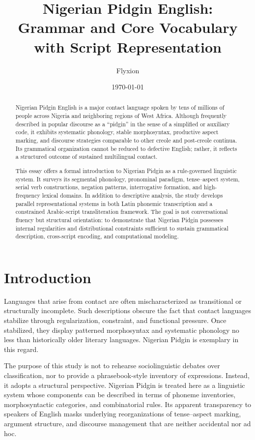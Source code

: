 \documentclass[12pt]{article}
\title{\textbf{Nigerian Pidgin English:\\
Grammar and Core Vocabulary with Script Representation}}
\author{Flyxion}
\date{\today}
\begin{document}
\maketitle

\begin{abstract}
\noindent
Nigerian Pidgin English is a major contact language spoken by tens of millions of people across Nigeria and neighboring regions of West Africa. Although frequently described in popular discourse as a “pidgin” in the sense of a simplified or auxiliary code, it exhibits systematic phonology, stable morphosyntax, productive aspect marking, and discourse strategies comparable to other creole and post-creole continua. Its grammatical organization cannot be reduced to defective English; rather, it reflects a structured outcome of sustained multilingual contact.

This essay offers a formal introduction to Nigerian Pidgin as a rule-governed linguistic system. It surveys its segmental phonology, pronominal paradigm, tense–aspect system, serial verb constructions, negation patterns, interrogative formation, and high-frequency lexical domains. In addition to descriptive analysis, the study develops parallel representational systems in both Latin phonemic transcription and a constrained Arabic-script transliteration framework. The goal is not conversational fluency but structural orientation: to demonstrate that Nigerian Pidgin possesses internal regularities and distributional constraints sufficient to sustain grammatical description, cross-script encoding, and computational modeling.
\end{abstract}

\newpage
\section{Introduction}

Languages that arise from contact are often mischaracterized as transitional or structurally incomplete. Such descriptions obscure the fact that contact languages stabilize through regularization, constraint, and functional pressure. Once stabilized, they display patterned morphosyntax and systematic phonology no less than historically older literary languages. Nigerian Pidgin is exemplary in this regard.

The purpose of this study is not to rehearse sociolinguistic debates over classification, nor to provide a phrasebook-style inventory of expressions. Instead, it adopts a structural perspective. Nigerian Pidgin is treated here as a linguistic system whose components can be described in terms of phoneme inventories, morphosyntactic categories, and combinatorial rules. Its apparent transparency to speakers of English masks underlying reorganizations of tense–aspect marking, argument structure, and discourse management that are neither accidental nor ad hoc.
\end{document}
